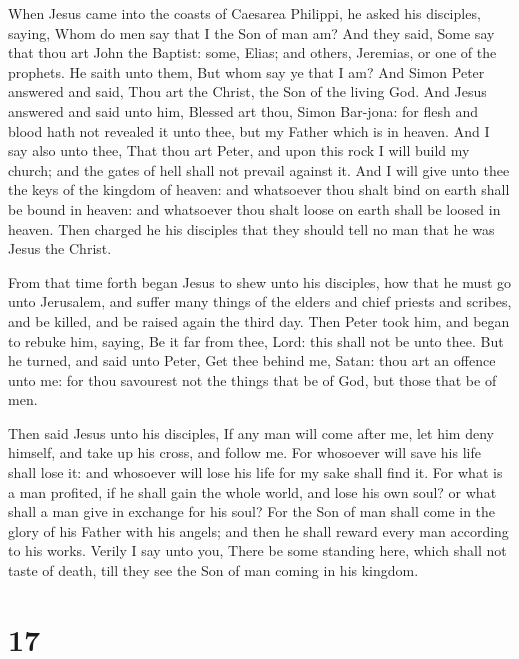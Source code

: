  When Jesus came into the coasts of Caesarea Philippi, he
asked his disciples, saying, Whom do men say that I the Son of man am?
 And they said, Some say that thou art John the Baptist:
some, Elias; and others, Jeremias, or one of the prophets. 
He saith unto them, But whom say ye that I am?  And Simon
Peter answered and said, Thou art the Christ, the Son of the living God.
 And Jesus answered and said unto him, Blessed art thou,
Simon Bar-jona: for flesh and blood hath not revealed it unto thee, but
my Father which is in heaven.  And I say also unto thee,
That thou art Peter, and upon this rock I will build my church; and the
gates of hell shall not prevail against it.  And I will
give unto thee the keys of the kingdom of heaven: and whatsoever thou
shalt bind on earth shall be bound in heaven: and whatsoever thou shalt
loose on earth shall be loosed in heaven.  Then charged he
his disciples that they should tell no man that he was Jesus the Christ.

 From that time forth began Jesus to shew unto his
disciples, how that he must go unto Jerusalem, and suffer many things of
the elders and chief priests and scribes, and be killed, and be raised
again the third day.  Then Peter took him, and began to
rebuke him, saying, Be it far from thee, Lord: this shall not be unto
thee.  But he turned, and said unto Peter, Get thee behind
me, Satan: thou art an offence unto me: for thou savourest not the
things that be of God, but those that be of men.

 Then said Jesus unto his disciples, If any man will come
after me, let him deny himself, and take up his cross, and follow me.
 For whosoever will save his life shall lose it: and
whosoever will lose his life for my sake shall find it. 
For what is a man profited, if he shall gain the whole world, and lose
his own soul? or what shall a man give in exchange for his soul?
 For the Son of man shall come in the glory of his Father
with his angels; and then he shall reward every man according to his
works.  Verily I say unto you, There be some standing here,
which shall not taste of death, till they see the Son of man coming in
his kingdom.

\hypertarget{section-16}{%
\section{17}\label{section-16}}

